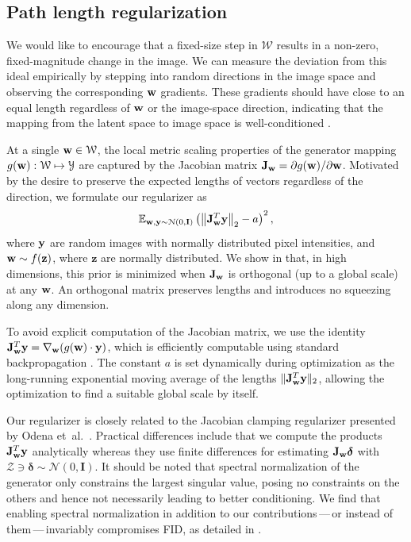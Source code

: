 \documentclass[10pt,twocolumn,letterpaper]{article}
\newcommand{\FINAL}[2][]{#2} %
\newcommand{\yy}{{\bf y}}
\newcommand{\ww}{{\bf w}}
\newcommand{\YY}{\mathcal{Y}}
\newcommand{\ZZ}{\mathcal{Z}}
\newcommand{\WW}{\mathcal{W}}
\newcommand{\JJT}{{\bf J}^T}
\newcommand{\expectation}{\mathbb{E}}
\begin{document}
\subsection{Path length regularization}
\label{sec:pathreg}

 
\FINAL{We would like to encourage that a fixed-size step in $\WW$ results in a non-zero, fixed-magnitude change in the image. 
We can measure the deviation from this ideal empirically by stepping into random directions in the image space and observing the corresponding $\ww$ gradients.
These gradients should have close to an equal length regardless of $\ww$ or the image-space direction, indicating that the mapping from the latent space to image space is well-conditioned \cite{Odena2018}.
}

At a single $\ww \in \WW$, the local metric scaling properties of the generator mapping $g(\ww) : \WW \mapsto \YY$  are captured by the Jacobian matrix $\mathbf{J}_\ww = {\partial g(\ww)}/{\partial \ww}$. %
Motivated by the desire to preserve the expected lengths of vectors regardless of the direction, we formulate our regularizer as
\begin{equation}
\expectation_{\ww, \yy \sim \mathcal{N}(0, \mathbf{I})} \left(\left\lVert \mathbf{J}_\ww^T \yy\right\rVert_2 - a\right)^2,
\end{equation}
where $\yy$ are random images with normally distributed pixel intensities, and $\ww \sim f(\mathbf{z})$, where $\mathbf{z}$ are normally distributed. We show in  that, in high dimensions, this prior is minimized when $\mathbf{J}_\ww$ is orthogonal (up to a global scale) at any $\ww$. An orthogonal matrix preserves lengths and introduces no squeezing along any dimension.

To avoid explicit computation of the Jacobian matrix, we use the identity $\JJT_\ww \yy = \nabla_\ww (g(\ww)\cdot \yy)$, which is efficiently computable using standard backpropagation \cite{Dauphin2015}. The constant $a$ is set dynamically during optimization as the long-running exponential moving average of the lengths $\lVert\JJT_\ww \yy\rVert_2$, allowing the optimization to find a suitable global scale by itself.

Our regularizer is closely related to the Jacobian clamping regularizer presented by Odena et~al.~\cite{Odena2018}. Practical differences include that we compute the products $\JJT_\ww \yy$ analytically whereas they use finite differences for estimating $\mathbf{J}_\ww \boldsymbol{\delta}$ with $\ZZ \ni \boldsymbol{\delta} \sim \mathcal{N}(0, \mathbf{I})$.
It should be noted that spectral normalization \cite{Miyato2018B} of the generator \cite{Zhang2018sagan} only constrains the largest singular value, posing no constraints on the others and hence not necessarily leading to better conditioning.
\FINAL{We find that enabling spectral normalization in addition to our contributions\,---\,or instead of them\,---\,invariably compromises FID, as detailed in \refappspectralnorm{}.}
\end{document}
